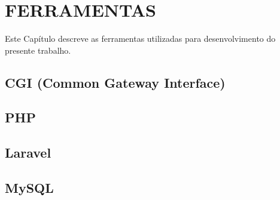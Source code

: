 
\chapter{FERRAMENTAS}
Este Capítulo descreve as ferramentas utilizadas para desenvolvimento do presente trabalho.


\section{CGI (Common Gateway Interface)}


\section{PHP}


\section{Laravel}


\section{MySQL}


%